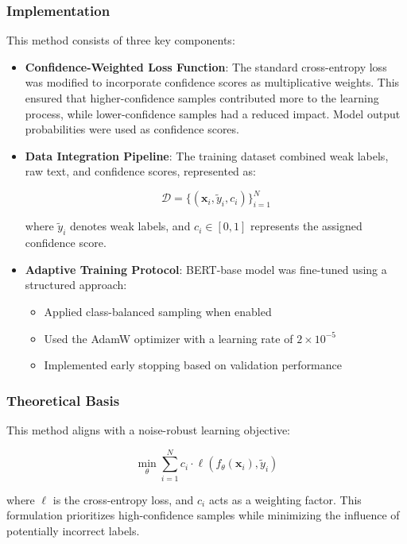 \subsubsection{Implementation}  

This method consists of three key components:  

\begin{itemize}
    \item \textbf{Confidence-Weighted Loss Function}: The standard cross-entropy loss was modified to incorporate confidence scores as multiplicative weights. This ensured that higher-confidence samples contributed more to the learning process, while lower-confidence samples had a reduced impact. Model output probabilities were used as confidence scores.

    \item \textbf{Data Integration Pipeline}: The training dataset combined weak labels, raw text, and confidence scores, represented as:  

    \begin{equation}
        \mathcal{D} = \{(\mathbf{x}_i, \tilde{y}_i, c_i)\}_{i=1}^N
    \end{equation}

    where $\tilde{y}_i$ denotes weak labels, and $c_i \in [0,1]$ represents the assigned confidence score.  

    \item \textbf{Adaptive Training Protocol}: BERT-base model was fine-tuned using a structured approach:  
    \begin{itemize}
        \item Applied class-balanced sampling when enabled  
        \item Used the AdamW optimizer with a learning rate of $2\times10^{-5}$  
        \item Implemented early stopping based on validation performance  
    \end{itemize}
\end{itemize}  

\subsubsection{Theoretical Basis}  

This method aligns with a noise-robust learning objective:  

\begin{equation}
    \min_\theta \sum_{i=1}^N c_i \cdot \ell(f_\theta(\mathbf{x}_i), \tilde{y}_i)
\end{equation}

where $\ell$ is the cross-entropy loss, and $c_i$ acts as a weighting factor. This formulation prioritizes high-confidence samples while minimizing the influence of potentially incorrect labels.  








